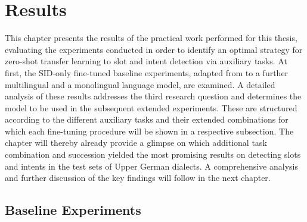 \documentclass[11pt,a4paper,twoside,openright]{scrbook}
\begin{document}
\chapter{Results}

This chapter presents the results of the practical work performed for this thesis, evaluating the experiments conducted in order to identify an optimal strategy for zero-shot transfer learning to slot and intent detection via auxiliary tasks. At first, the SID-only fine-tuned baseline experiments, adapted from \citet{van-der-goot-etal-2021-masked} to a further multilingual and a monolingual language model, are examined. A detailed analysis of these results addresses the third research question and determines the model to be used in the subsequent extended experiments. These are structured according to the different auxiliary tasks and their extended combinations for which each fine-tuning procedure will be shown in a respective subsection. The chapter will thereby already provide a glimpse on which additional task combination and succession yielded the most promising results on detecting slots and intents in the test sets of Upper German dialects. A comprehensive analysis and further discussion of the key findings will follow in the next chapter.






\section{Baseline Experiments}
\end{document}
